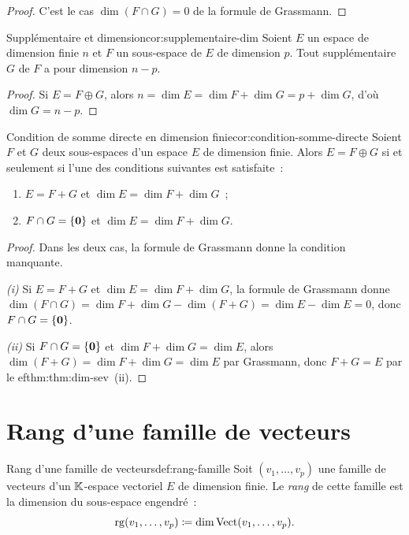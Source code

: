 \begin{proof}
  C'est le cas $\dim(F\cap G)=0$ de la formule de Grassmann.
\end{proof}

\begin{corollary}{Supplémentaire et dimension}{cor:supplementaire-dim}
  Soient $E$ un espace de dimension finie $n$ et $F$ un sous-espace de
  $E$ de dimension $p$. Tout supplémentaire $G$ de $F$ a pour dimension
  $n-p$.
\end{corollary}

\begin{proof}
  Si $E=F\oplus G$, alors $n=\dim E=\dim F+\dim G=p+\dim G$, d'où
  $\dim G=n-p$.
\end{proof}

\begin{corollary}{Condition de somme directe en dimension finie}{cor:condition-somme-directe}
  Soient $F$ et $G$ deux sous-espaces d'un espace $E$ de dimension
  finie. Alors $E=F\oplus G$ si et seulement si l'une des conditions
  suivantes est satisfaite~:
  \begin{enumerate}[label=(\roman*)]
    \item $E=F+G$ et $\dim E=\dim F+\dim G$~;
    \item $F\cap G=\left\{\mathbf{0}\right\}$ et $\dim E=\dim F+\dim G$.
  \end{enumerate}
\end{corollary}

\begin{proof}
  Dans les deux cas, la formule de Grassmann donne la condition manquante.

  \emph{(i)} Si $E=F+G$ et $\dim E=\dim F+\dim G$, la formule de
  Grassmann donne $\dim(F\cap G)=\dim F+\dim G-\dim(F+G)=\dim E-\dim E=0$,
  donc $F\cap G=\left\{\mathbf{0}\right\}$.

  \emph{(ii)} Si $F\cap G=\left\{\mathbf{0}\right\}$ et $\dim F+\dim G=\dim E$,
  alors $\dim(F+G)=\dim F+\dim G=\dim E$ par Grassmann, donc $F+G=E$
  par le 
ef{thm:thm:dim-sev}~(ii).
\end{proof}

\section{Rang d'une famille de vecteurs}\label{sec:rang}

\begin{definition}{Rang d'une famille de vecteurs}{def:rang-famille}
  Soit $(v_1,\ldots,v_p)$ une famille de vecteurs d'un ${\mathbb{K}}$-espace
  vectoriel $E$ de dimension finie. Le \emph{rang} de cette famille est
  la dimension du sous-espace engendré~:
  \[
    \operatorname{rg}(v_1,\ldots,v_p) \coloneqq \dim\operatorname{Vect}(v_1,\ldots,v_p).
  \]
\end{definition}

